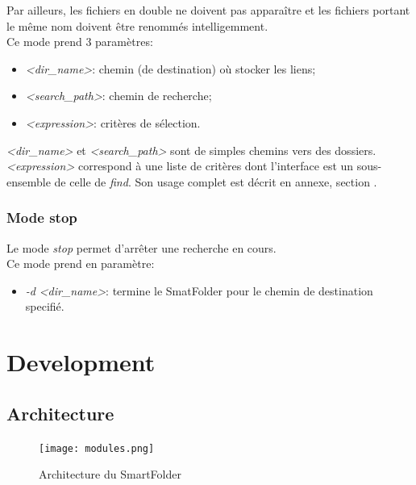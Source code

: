\documentclass[11pt, a4paper]{article}
\begin{document}
Par ailleurs, les fichiers en double ne doivent pas apparaître et les fichiers portant le même nom doivent être renommés intelligemment. \\

Ce mode prend 3 paramètres:
\begin{itemize}
    \item \textit{<dir\_name>}: chemin (de destination) où stocker les liens;
    \item \textit{<search\_path>}: chemin de recherche;
    \item \textit{<expression>}: critères de sélection. \\
\end{itemize}

\textit{<dir\_name>} et \textit{<search\_path>} sont de simples chemins vers des dossiers.\\
\textit{<expression>} correspond à une liste de critères dont l'interface est un sous-ensemble de celle de \textit{find}. Son usage complet est décrit en annexe, section .


\subsubsection{Mode stop}
Le mode \textit{stop} permet d'arrêter une recherche en cours. \\

Ce mode prend en paramètre:
\begin{itemize}
	\renewcommand\labelitemi{}
    \item \textit{-d} \textit{<dir\_name>}: termine le SmatFolder pour le chemin de destination specifié.
\end{itemize}

\newpage

\section{Development}
\subsection{Architecture}

\begin{figure}[H]
    \begin{center}
        \texttt{[image: modules.png]}
    \end{center}
    \caption{Architecture du SmartFolder}
    \label{Architecture du SmartFolder}
\end{figure}
\end{document}
